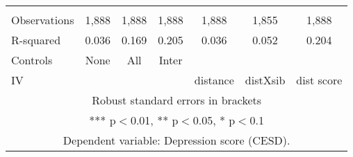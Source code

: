 \begin{tabular}{lcccccc}
 &  &  &  &  &  &  \\
Observations & 1,888 & 1,888 & 1,888 & 1,888 & 1,855 & 1,888 \\
R-squared & 0.036 & 0.169 & 0.205 & 0.036 & 0.052 & 0.204 \\
Controls & None & All & Inter &  &  &  \\
 IV &  &  &  & distance & distXsib & dist score \\ \hline
\multicolumn{7}{c}{ Robust standard errors in brackets} \\
\multicolumn{7}{c}{ *** p$<$0.01, ** p$<$0.05, * p$<$0.1} \\
\multicolumn{7}{c}{ Dependent variable: Depression score (CESD).} \\
\end{tabular}
